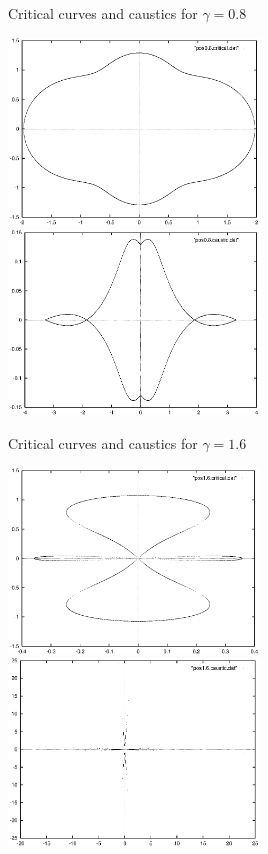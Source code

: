 \documentclass[aspectratio=1610,xcolor=dvipsnames,t]{beamer}
\begin{document}
    \begin{frame}{Critical curves and caustics for $\gamma = 0.8$}
        \begin{center}
                \includegraphics[width=0.5\textwidth]{images/pos0-8-critical.eps} 
                \includegraphics[width=0.5\textwidth]{images/pos0-8-caustic.eps} 
        \end{center}
    \end{frame} 

    \begin{frame}{Critical curves and caustics for $\gamma = 1.6$} 
        \begin{center}
            \includegraphics[width=0.5\textwidth]{images/pos1-6-critical.eps} 
            \includegraphics[width=0.5\textwidth]{images/pos1-6-caustic.eps} 
        \end{center}
    \end{frame} 
\end{document}
